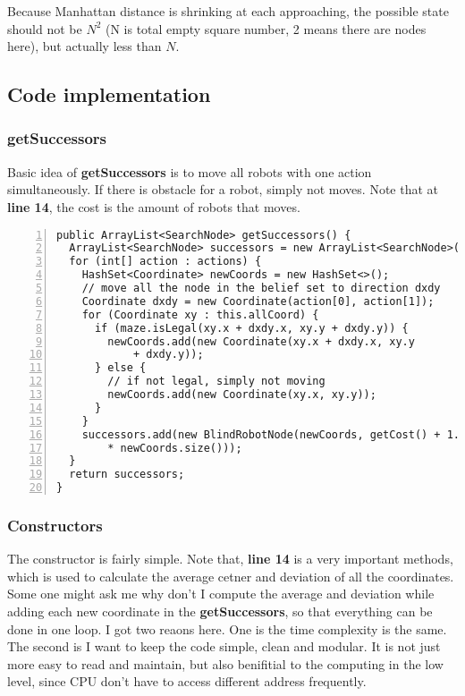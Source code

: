 \documentclass{article}
\begin{document}
Because Manhattan distance is shrinking at each approaching, the possible state should not be $N^2$ (N is total empty square number, 2 means there are nodes here), but actually less than $N$.

\subsection{Code implementation}

\subsubsection{getSuccessors}
Basic idea of \textbf{getSuccessors} is to move all robots with one action simultaneously. If there is obstacle for a robot, simply not moves. Note that at  \textbf{line 14}, the cost is the amount of robots that moves.
\begin{lstlisting}[numbers=left]
public ArrayList<SearchNode> getSuccessors() {
  ArrayList<SearchNode> successors = new ArrayList<SearchNode>();
  for (int[] action : actions) {
    HashSet<Coordinate> newCoords = new HashSet<>();
    // move all the node in the belief set to direction dxdy
    Coordinate dxdy = new Coordinate(action[0], action[1]);
    for (Coordinate xy : this.allCoord) {
      if (maze.isLegal(xy.x + dxdy.x, xy.y + dxdy.y)) {
        newCoords.add(new Coordinate(xy.x + dxdy.x, xy.y
            + dxdy.y));
      } else {
        // if not legal, simply not moving
        newCoords.add(new Coordinate(xy.x, xy.y));
      }
    }
    successors.add(new BlindRobotNode(newCoords, getCost() + 1.0
        * newCoords.size()));
  }
  return successors;
}
\end{lstlisting}


\subsubsection{Constructors}
The constructor is fairly simple. Note that, \textbf{line 14} is a very important methods, which is used to calculate the average cetner and deviation of all the coordinates. Some one might ask me why don't I compute the average and deviation while adding each new coordinate in the \textbf{getSuccessors}, so that everything can be done in one loop.  I got two reaons here. One is the time complexity is the same. The second is I want to keep the code simple, clean and modular. It is not just more easy to read and maintain, but also benifitial to the computing in the low level, since CPU don't have to access different address frequently.
\end{document}
